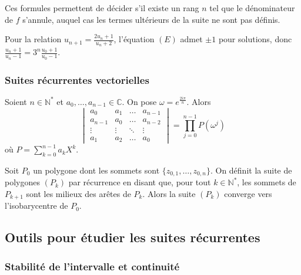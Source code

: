   \begin{remark}
    Ces formules permettent de décider s'il existe un rang $n$ tel que le dénominateur de $f$ s'annule, auquel cas les termes ultérieurs de la suite ne sont pas définis.
  \end{remark}

  \begin{example}
    Pour la relation $u_{n+1} = \frac{2u_n + 1}{u_n + 2}$, l'équation $(E)$ admet $\pm 1$ pour solutions, donc $\frac{u_n + 1}{u_n - 1} = 3^n \frac{u_0 + 1}{u_0 - 1}$.
  \end{example}

  \subsubsection{Suites récurrentes vectorielles}


  \begin{proposition}
    Soient $n \in \mathbb{N}^*$ et $a_0, \dots, a_{n-1} \in \mathbb{C}$. On pose $\omega = e^{\frac{2i\pi}{n}}$. Alors
    \[ \begin{vmatrix} a_0 & a_1 & \dots & a_{n-1} \\ a_{n-1} & a_0 & \dots & a_{n-2}\\ \vdots & \vdots & \ddots & \vdots \\ a_1 & a_2 & \dots & a_0 \end{vmatrix} = \prod_{j=0}^{n-1} P(\omega^j) \]
    où $P = \sum_{k=0}^{n-1} a_k X^k$.
  \end{proposition}


  \begin{application}
    Soit $P_0$ un polygone dont les sommets sont $\{ z_{0,1}, \dots, z_{0,n} \}$. On définit la suite de polygones $(P_k)$ par récurrence en disant que, pour tout $k \in \mathbb{N}^*$, les sommets de $P_{k+1}$ sont les milieux des arêtes de $P_k$.
    \newpar
    Alors la suite $(P_k)$ converge vers l'isobarycentre de $P_0$.
  \end{application}

  \subsection{Outils pour étudier les suites récurrentes}

  \subsubsection{Stabilité de l'intervalle et continuité}

